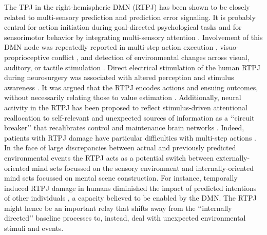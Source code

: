 \documentclass[10pt,letterpaper]{article}
\begin{document}
The TPJ in the right-hemispheric DMN (RTPJ)
has been shown to be closely related to
multi-sensory prediction and prediction error signaling.
It is probably central for
action initiation during goal-directed psychological tasks and for
sensorimotor behavior by integrating multi-sensory attention
\citep{corbetta2002control}.
Involvement of this DMN node was repeatedly reported in
multi-step action execution \citep{hartmann2005takes},
visuo-proprioceptive conflict \citep{Balslev2005}, and
detection of environmental changes across
visual, auditory, or tactile stimulation
\citep{downar2000multimodal}.
Direct electrical stimulation of the human
RTPJ during neurosurgery was associated with altered perception
and stimulus awareness \citep{blanke2002neuropsychology}.
%
It was argued that the RTPJ encodes actions and ensuing outcomes,
without necessarily relating those to value estimation
\citep{liljeholm2013neural, hamilton2008action,
jakobs2009effects}.
Additionally, neural activity in the RTPJ has been proposed to reflect
stimulus-driven attentional reallocation to
self-relevant and unexpected sources of information
as a ‘‘circuit breaker’’ that recalibrates control and maintenance brain networks
\citep{bzdok2013tpj, corbettashul2008}.
Indeed, patients with RTPJ damage have particular difficulties
with multi-step actions \citep{hartmann2005takes}.
In the face of large discrepancies between actual and previously predicted
environmental events the RTPJ acts as a potential switch between
externally-oriented mind sets focussed on the
sensory environment and internally-oriented mind sets focussed
on mental scene construction.
For instance, temporally induced RTPJ damage in humans diminished the
impact of predicted intentions of other individuals
\citep{young2010disruption},
a capacity believed to be enabled by the DMN.
The RTPJ might hence be an important relay that shifts away
from the ‘‘internally directed’’ baseline processes
to, instead, deal with unexpected environmental stimuli and events.
\end{document}
